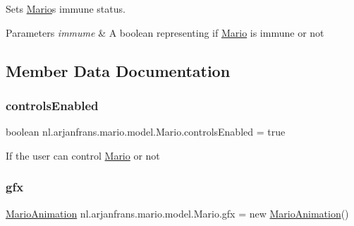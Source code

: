 Sets \hyperlink{classnl_1_1arjanfrans_1_1mario_1_1model_1_1Mario}{Mario}\textquotesingle{}s immune status. 


\begin{DoxyParams}{Parameters}
{\em immume} & A boolean representing if \hyperlink{classnl_1_1arjanfrans_1_1mario_1_1model_1_1Mario}{Mario} is immune or not \\
\hline
\end{DoxyParams}


\subsection{Member Data Documentation}
\mbox{\label{classnl_1_1arjanfrans_1_1mario_1_1model_1_1Mario_a5274108ef60b357abdca2e64b6378d58}} 
\subsubsection{\texorpdfstring{controls\+Enabled}{controlsEnabled}}
{\footnotesize\ttfamily boolean nl.\+arjanfrans.\+mario.\+model.\+Mario.\+controls\+Enabled = true\hspace{0.3cm}{\ttfamily [private]}}

If the user can control \hyperlink{classnl_1_1arjanfrans_1_1mario_1_1model_1_1Mario}{Mario} or not \mbox{\label{classnl_1_1arjanfrans_1_1mario_1_1model_1_1Mario_a62bcb1022af69fedb1191fba75da65b2}} 
\subsubsection{\texorpdfstring{gfx}{gfx}}
{\footnotesize\ttfamily \hyperlink{classnl_1_1arjanfrans_1_1mario_1_1graphics_1_1MarioAnimation}{Mario\+Animation} nl.\+arjanfrans.\+mario.\+model.\+Mario.\+gfx = new \hyperlink{classnl_1_1arjanfrans_1_1mario_1_1graphics_1_1MarioAnimation}{Mario\+Animation}()\hspace{0.3cm}{\ttfamily [protected]}}

